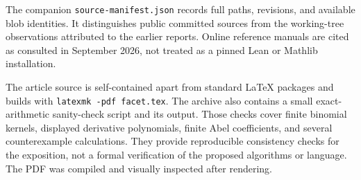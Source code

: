 \documentclass[11pt,letterpaper]{article}
\newcommand{\code}[1]{\nolinkurl{#1}}
\numberwithin{equation}{section}
\begin{document}
The companion \code{source-manifest.json} records full paths, revisions, and
available blob identities. It distinguishes public committed sources from the
working-tree observations attributed to the earlier reports. Online reference
manuals are cited as consulted in September 2026, not treated as a pinned Lean
or Mathlib installation.

The article source is self-contained apart from standard LaTeX packages and
builds with \code{latexmk -pdf facet.tex}. The archive also contains a small
exact-arithmetic sanity-check script and its output. Those checks cover finite
binomial kernels, displayed derivative polynomials, finite Abel coefficients,
and several counterexample calculations. They provide reproducible consistency
checks for the exposition, not a formal verification of the proposed algorithms
or language. The PDF was compiled and visually inspected after rendering.
\end{document}
